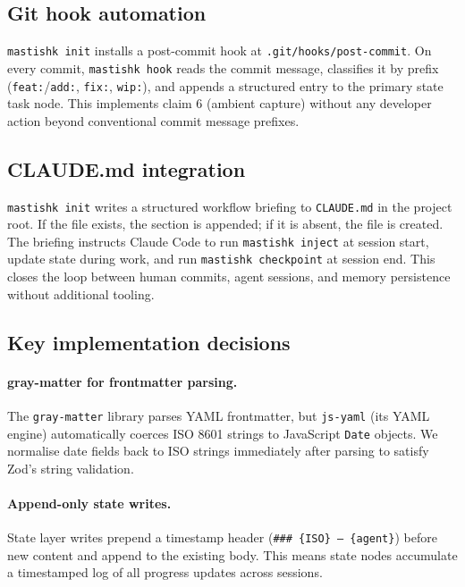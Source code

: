 \documentclass[11pt]{article}
\begin{document}
\subsection{Git hook automation}

\texttt{mastishk init} installs a post-commit hook at \texttt{.git/hooks/post-commit}. On every commit, \texttt{mastishk hook} reads the commit message, classifies it by prefix (\texttt{feat:}/\texttt{add:}, \texttt{fix:}, \texttt{wip:}), and appends a structured entry to the primary state task node. This implements claim 6 (ambient capture) without any developer action beyond conventional commit message prefixes.

\subsection{CLAUDE.md integration}

\texttt{mastishk init} writes a structured workflow briefing to \texttt{CLAUDE.md} in the project root. If the file exists, the section is appended; if it is absent, the file is created. The briefing instructs Claude Code to run \texttt{mastishk inject} at session start, update state during work, and run \texttt{mastishk checkpoint} at session end. This closes the loop between human commits, agent sessions, and memory persistence without additional tooling.

\subsection{Key implementation decisions}

\paragraph{gray-matter for frontmatter parsing.}
The \texttt{gray-matter} library parses YAML frontmatter, but \texttt{js-yaml} (its YAML engine) automatically coerces ISO 8601 strings to JavaScript \texttt{Date} objects. We normalise date fields back to ISO strings immediately after parsing to satisfy Zod's string validation.

\paragraph{Append-only state writes.}
State layer writes prepend a timestamp header (\texttt{\#\#\# \{ISO\} --- \{agent\}}) before new content and append to the existing body. This means state nodes accumulate a timestamped log of all progress updates across sessions.
\end{document}
